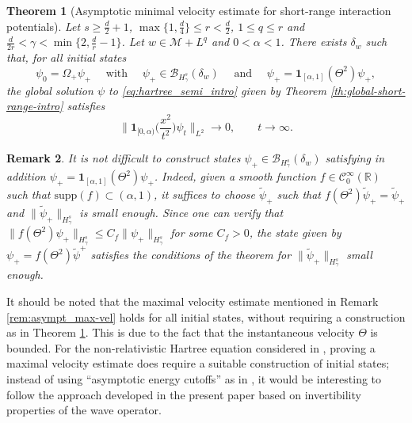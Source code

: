 \documentclass[12pt]{article}
\theoremstyle{plain}
\newtheorem{theo}{Theorem}[section]
\newtheorem{rem}[theo]{Remark}
\begin{document}
\begin{theo}[Asymptotic minimal velocity estimate for short-range interaction potentials]\label{th:min-vel-intro}
    Let $s\ge\frac  d2+1$, $\max\{1,\frac{d}{4}\}\le r<\frac{d}{2}$, $1\le q\le r$ and $\frac{d}{2r}<\gamma<\min\{2, \frac dr-1\}$. Let $w\in \mathcal{M}+L^{q}$ and $0<\alpha<1$. There exists $\delta_w$ such that, for all initial states
    \begin{equation*}
    \psi_0=\Omega_+\psi_+ \quad\text{ with }\quad \psi_+\in \mathcal{B}_{H^s_\gamma}(\delta_w) \quad\text{ and }\quad \psi_+=\mathbf{1}_{[\alpha,1]}(\Theta^2)\psi_+,
    \end{equation*}
    the global solution $\psi$ to \eqref{eq:hartree_semi_intro} given by Theorem \ref{th:global-short-range-intro} satisfies
    \begin{equation*}
\Big\| \mathbf{1}_{[0,\alpha)}\Big(\frac{x^2}{t^2}\Big) \psi_t\Big\|_{L^2} \to 0, \qquad t\to\infty.
\end{equation*}
\end{theo}

\begin{rem}
    It is not difficult to construct states $\psi_+\in \mathcal{B}_{H^s_\gamma}(\delta_w)$ satisfying in addition $\psi_+=\mathbf{1}_{[\alpha,1]}(\Theta^2)\psi_+$. Indeed, given a smooth function $f\in\mathcal{C}_0^\infty(\mathbb{R})$ such that $\mathrm{supp}(f)\subset(\alpha,1)$, it suffices to choose $\tilde\psi_+$ such that $f(\Theta^2)\tilde\psi_+=\tilde\psi_+$ and $\|\tilde\psi_+\|_{H^s_\gamma}$ is small enough. Since one can verify that $\|f(\Theta^2)\psi_+\|_{H^s_\gamma}\le C_f\|\psi_+\|_{H^s_\gamma}$ for some $C_f>0$, the state given by $\psi_+=f(\Theta^2)\tilde\psi^+$ satisfies the conditions of the theorem for $\|\tilde\psi_+\|_{H^s_\gamma}$ small enough. 
\end{rem}


It should be noted that the maximal velocity estimate mentioned in Remark \ref{rem:asympt_max-vel} holds for all initial states, without requiring a construction as in Theorem  \ref{th:min-vel-intro}. This is due to the fact that the instantaneous velocity $\Theta$ is bounded. For the non-relativistic Hartree equation considered in \cite{ArbunichFaupinPusateriSigal23}, proving a maximal velocity estimate does require a suitable construction of initial states; instead of using ``asymptotic energy cutoffs'' as in \cite{ArbunichFaupinPusateriSigal23}, it would be interesting to follow the approach developed in the present paper based on  invertibility properties of the wave operator. 
\end{document}
